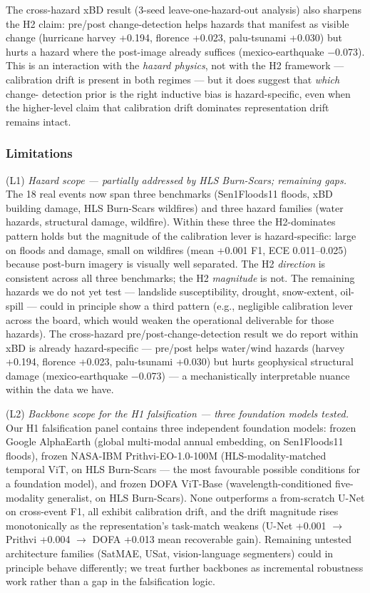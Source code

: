 \documentclass[sn-nature,lineno]{sn-jnl}
\theoremstyle{thmstyleone}
\theoremstyle{thmstyletwo}
\theoremstyle{thmstylethree}
\begin{document}
The cross-hazard xBD result (3-seed leave-one-hazard-out analysis) also
sharpens the H2 claim: pre/post change-detection helps hazards that
manifest as visible change (hurricane harvey +0.194, florence +0.023,
palu-tsunami +0.030) but hurts a hazard where the post-image already
suffices (mexico-earthquake $-$0.073). This is an interaction with the
\emph{hazard physics}, not with the H2 framework --- calibration drift is
present in both regimes --- but it does suggest that \emph{which} change-
detection prior is the right inductive bias is hazard-specific, even
when the higher-level claim that calibration drift dominates
representation drift remains intact.

\subsubsection{Limitations}\label{limitations}

(L1) \emph{Hazard scope --- partially addressed by HLS Burn-Scars; remaining
gaps.} The 18 real events now span three benchmarks (Sen1Floods11 floods,
xBD building damage, HLS Burn-Scars wildfires) and three hazard families
(water hazards, structural damage, wildfire). Within these three the
H2-dominates pattern holds but the magnitude of the calibration lever is
hazard-specific: large on floods and damage, small on wildfires (mean
+0.001 F1, ECE 0.011--0.025) because post-burn imagery is visually well
separated. The H2 \emph{direction} is consistent across all three benchmarks;
the H2 \emph{magnitude} is not. The remaining hazards we do not yet test ---
landslide susceptibility, drought, snow-extent, oil-spill --- could in
principle show a third pattern (e.g., negligible calibration lever
across the board, which would weaken the operational deliverable for
those hazards). The cross-hazard pre/post-change-detection result we
do report within xBD is already hazard-specific --- pre/post helps
water/wind hazards (harvey +0.194, florence +0.023, palu-tsunami
+0.030) but hurts geophysical structural damage (mexico-earthquake
$-$0.073) --- a mechanistically interpretable nuance within the data we
have.

(L2) \emph{Backbone scope for the H1 falsification --- three foundation models
tested.} Our H1 falsification panel contains three independent
foundation models: frozen Google AlphaEarth (global multi-modal annual
embedding, on Sen1Floods11 floods), frozen NASA-IBM
Prithvi-EO-1.0-100M (HLS-modality-matched temporal ViT, on HLS
Burn-Scars --- the most favourable possible conditions for a foundation
model), and frozen DOFA ViT-Base (wavelength-conditioned five-modality
generalist, on HLS Burn-Scars). None outperforms a from-scratch U-Net
on cross-event F1, all exhibit calibration drift, and the drift
magnitude rises monotonically as the representation's task-match
weakens (U-Net +0.001 $\rightarrow$ Prithvi +0.004 $\rightarrow$ DOFA +0.013 mean recoverable
gain). Remaining untested architecture families (SatMAE, USat,
vision-language segmenters) could in principle behave differently; we
treat further backbones as incremental robustness work rather than a
gap in the falsification logic.
\end{document}
